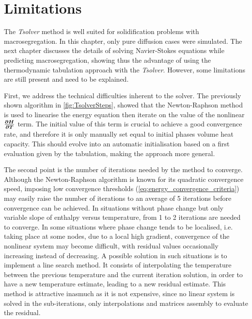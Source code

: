 \section{Limitations}

The \emph{Tsolver} method is well suited for 
solidification problems with macrosegregation. In this chapter, only pure diffusion cases were simulated. 
The next chapter discusses the details of solving Navier-Stokes equations while predicting macrosegregation, 
showing thus the advantage of using the thermodynamic tabulation approach with the \emph{Tsolver}.
However, some limitations are still present and need to be explained.

First, we address the technical difficulties inherent to the solver. The previously shown algorithm in \cref{fig:TsolverSteps},
showed that the Newton-Raphson method is used to linearise the energy equation then iterate on the value of the nonlinear
$\boldsymbol{\frac{\partial H}{\partial T}}$ term. The initial value of this term is crucial to achieve a good convergence rate, and therefore it is only manually set equal 
to initial phases volume heat capacity. This should evolve into an automatic initialisation based on a first evaluation given by the tabulation,
making the approach more general. 

The second point is the number of iterations needed by the method to converge.
Although the Newton-Raphson algorithm is known for its quadratic convergence speed, imposing low convergence thresholds (\cref{eq:energy_convergence_criteria}) 
may easily raise the number of iterations to an average of 5 iterations before convergence can be achieved. In situations without
phase change but only variable slope of enthalpy versus temperature, from 1 to 2 iterations are needed to converge.
In some situations where phase change tends to be localised, i.e. taking place at some nodes, due to a local high gradient, convergence of
the nonlinear system may become difficult, with residual values occasionally increasing instead of decreasing.  
A possible solution in such situations is to implement a line search method. It consists of interpolating the temperature between the previous temperature
and the current iteration solution, in order to have a new temperature estimate, leading to a new residual estimate. This method is attractive inasmuch as
it is not expensive, since no linear system is solved in the sub-iterations, only interpolations and matrices assembly to evaluate the residual.

